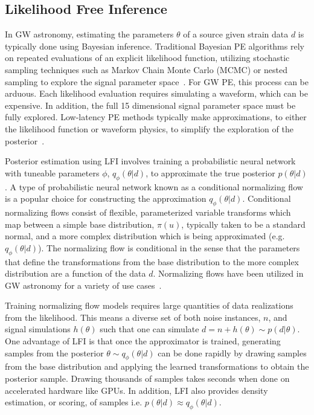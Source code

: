 \begin{refsection}
\section{Likelihood Free Inference} \label{amp_res_sec:lfi}
In GW astronomy, estimating the parameters $\theta$ of a source given strain data $d$ is typically done using Bayesian inference. 
Traditional Bayesian PE algorithms rely on repeated evaluations of an explicit likelihood function, utilizing stochastic sampling techniques such as Markov Chain Monte Carlo (MCMC) or nested sampling to explore the signal parameter space~\cite{Ashton_2019, lalinference_paper}. 
For GW PE, this process can be arduous. 
Each likelihood evaluation requires simulating a waveform, which can be expensive. 
In addition, the full 15 dimensional signal parameter space must be fully explored. 
Low-latency PE methods typically make approximations, to either the likelihood function or waveform physics, to simplify the exploration of the posterior~\cite{Canizares:2014fya, Morisaki:2023kuq, Morisaki:2020oqk, Singer_2016}.

Posterior estimation using LFI involves training a probabilistic neural network with tuneable parameters $\phi$, $q_\phi(\theta | d)$, to approximate the true posterior $p(\theta | d)$. 
A type of probabilistic neural network known as a conditional normalizing flow~\cite{papamakarios2021normalizing} is a popular choice for constructing the approximation $q_\phi(\theta | d)$. 
Conditional normalizing flows consist of flexible, parameterized variable transforms which map between a simple base distribution, $\pi(u)$, typically taken to be a standard normal, and a more complex distribution which is being approximated (e.g. $q_\phi(\theta|d)$). 
The normalizing flow is conditional in the sense that the parameters that define the transformations from the base distribution to the more complex distribution are a function of the data $d$. 
Normalizing flows have been utilized in GW astronomy for a variety of use cases~\cite{Dax_2021, Dax_2025, Williams:2021qyt, PhysRevD.109.102004}.

Training normalizing flow models requires large quantities of data realizations from the likelihood. 
This means a diverse set of both noise instances, $n$, and signal simulations $h(\theta)$ such that one can simulate $d = n + h(\theta) \sim p(d|\theta)$. 
One advantage of LFI is that once the approximator is trained, generating samples from the posterior $\theta \sim q_\phi(\theta | d)$ can be done rapidly by drawing samples from the base distribution and applying the learned transformations to obtain the posterior sample. 
Drawing thousands of samples takes seconds when done on accelerated hardware like GPUs. 
In addition, LFI also provides density estimation, or scoring, of samples i.e. $p(\theta \vert d)\approx q_\phi(\theta \vert d)$.


\end{refsection}
